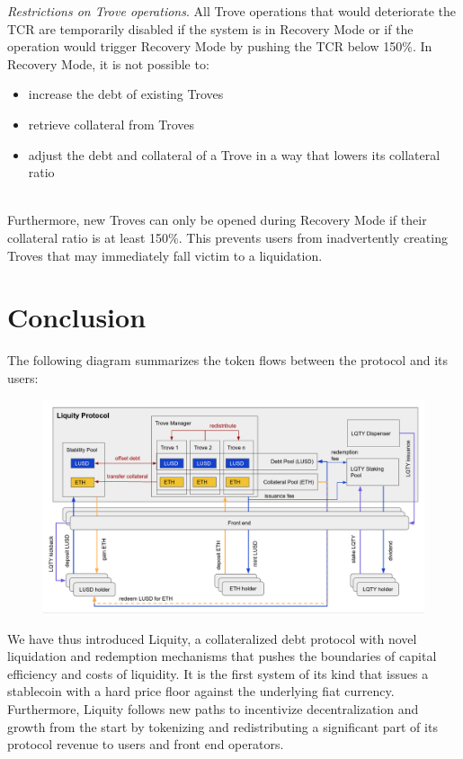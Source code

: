 \documentclass{article}
\begin{document}
\textit{Restrictions on Trove operations}. All Trove operations that would deteriorate the TCR are temporarily disabled if the system is in Recovery Mode or if the operation would trigger Recovery Mode by pushing the TCR below 150\%. In Recovery Mode, it is not possible to:
\begin{itemize}
    \item increase the debt of existing Troves
    \item retrieve collateral from Troves
    \item adjust the debt and collateral of a Trove in a way that lowers its collateral ratio 
\end{itemize}
\\

Furthermore, new Troves can only be opened during Recovery Mode if their collateral ratio is at least 150\%. This prevents users from inadvertently creating Troves that may immediately fall victim to a liquidation.

\section{Conclusion}
The following diagram summarizes the token flows between the protocol and its users:\\

\begin{figure}[ht]
\centering
\includegraphics[width=16cm]{a14.png}
\end{figure}

We have thus introduced Liquity, a collateralized debt protocol with novel liquidation and redemption mechanisms that pushes the boundaries of capital efficiency and costs of liquidity. It is the first system of its kind that issues a stablecoin with a hard price floor against the underlying fiat currency. Furthermore, Liquity follows new paths to incentivize decentralization and growth from the start by tokenizing and redistributing a significant part of its protocol revenue to users and front end operators. 
\end{document}
